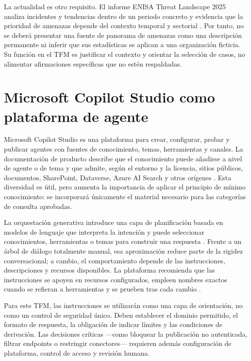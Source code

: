 La actualidad es otro requisito. El informe ENISA Threat Landscape 2025 analiza
incidentes y tendencias dentro de un periodo concreto y evidencia que la
prioridad de amenazas depende del contexto temporal y sectorial
\cite{enisaThreat2025}. Por tanto, no se deberá presentar una fuente de panorama
de amenazas como una descripción permanente ni inferir que sus estadísticas se
aplican a una organización ficticia. Su función en el TFM es justificar el
contexto y orientar la selección de casos, no alimentar afirmaciones específicas
que no estén respaldadas.

\section{Microsoft Copilot Studio como plataforma de agente}
\label{sec:copilot-studio}

Microsoft Copilot Studio es una plataforma para crear, configurar, probar y
publicar agentes con fuentes de conocimiento, temas, herramientas y canales. La
documentación de producto describe que el conocimiento puede añadirse a nivel de
agente o de tema y que admite, según el entorno y la licencia, sitios públicos,
documentos, SharePoint, Dataverse, Azure AI Search y otros orígenes
\cite{copilotKnowledge}. Esta diversidad es útil, pero aumenta la importancia de
aplicar el principio de mínimo conocimiento: se incorporará únicamente el
material necesario para las categorías de consulta aprobadas.

La orquestación generativa introduce una capa de planificación basada en modelos
de lenguaje que interpreta la intención y puede seleccionar conocimientos,
herramientas o temas para construir una respuesta \cite{copilotOrchestration}.
Frente a un árbol de diálogo totalmente manual, esa aproximación reduce parte de
la rigidez conversacional; a cambio, el comportamiento depende de las
instrucciones, descripciones y recursos disponibles. La plataforma recomienda
que las instrucciones se apoyen en recursos configurados, empleen nombres
exactos cuando se refieran a herramientas y se prueben tras cada cambio
\cite{copilotInstructions}.

Para este TFM, las instrucciones se utilizarán como una capa de orientación, no
como un control de seguridad único. Deben establecer el dominio permitido, el
formato de respuesta, la obligación de indicar límites y las condiciones de
derivación. Las decisiones críticas ---como bloquear la publicación no
autenticada, filtrar endpoints o restringir conectores--- requieren además
configuración de plataforma, control de acceso y revisión humana.

